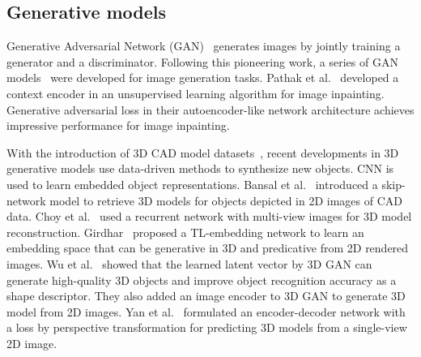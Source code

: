 \documentclass[10pt,twocolumn,letterpaper]{article}
\begin{document}
\subsection{Generative models}
Generative Adversarial Network (GAN)~\cite{gan} generates images by jointly training a generator and a discriminator. Following this pioneering work, a series of GAN models~\cite{dcgan,lapgan} were developed for image generation tasks. Pathak et al.~\cite{contextencoder} developed a context encoder in an unsupervised learning algorithm for image inpainting. Generative adversarial loss in their autoencoder-like network architecture achieves impressive performance for image inpainting.%

With the introduction of 3D CAD model datasets~\cite{modelnet,shapenet}, recent developments in 3D generative models use data-driven methods to synthesize new objects. CNN is used to learn embedded object representations. Bansal et al.~\cite{marr} introduced a skip-network model to retrieve 3D models for objects depicted in 2D images of CAD data. Choy et al.~\cite{r2n2} used a recurrent network with multi-view images for 3D model reconstruction. Girdhar~\cite{tl} proposed a TL-embedding network to learn an embedding space that can be generative in 3D and predicative from 2D rendered images. Wu et al.~\cite{3dgan} showed that the learned latent vector by 3D GAN can generate high-quality 3D objects and improve object recognition accuracy as a shape descriptor. They also added an image encoder to 3D GAN to generate 3D model from 2D images. Yan et al.~\cite{honglak} formulated an encoder-decoder network with a loss by perspective transformation for predicting 3D models from a single-view 2D image.
\end{document}
